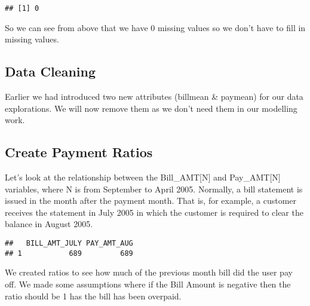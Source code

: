 \documentclass[]{article}
\newenvironment{Shaded}{\begin{snugshade}}{\end{snugshade}}
\newcommand{\KeywordTok}[1]{\textcolor[rgb]{0.13,0.29,0.53}{\textbf{#1}}}
\newcommand{\DecValTok}[1]{\textcolor[rgb]{0.00,0.00,0.81}{#1}}
\newcommand{\StringTok}[1]{\textcolor[rgb]{0.31,0.60,0.02}{#1}}
\newcommand{\OtherTok}[1]{\textcolor[rgb]{0.56,0.35,0.01}{#1}}
\newcommand{\OperatorTok}[1]{\textcolor[rgb]{0.81,0.36,0.00}{\textbf{#1}}}
\newcommand{\NormalTok}[1]{#1}
\begin{document}
\begin{verbatim}
## [1] 0
\end{verbatim}

So we can see from above that we have 0 missing values so we don't have
to fill in missing values.

\subsection{Data Cleaning}\label{data-cleaning}

Earlier we had introduced two new attributes (billmean \& paymean) for
our data explorations. We will now remove them as we don't need them in
our modelling work.

\begin{Shaded}
\end{Shaded}

\subsection{Create Payment Ratios}\label{create-payment-ratios}

Let's look at the relationship between the Bill\_AMT{[}N{]} and
Pay\_AMT{[}N{]} variables, where N is from September to April 2005.
Normally, a bill statement is issued in the month after the payment
month. That is, for example, a customer receives the statement in July
2005 in which the customer is required to clear the balance in August
2005.

\begin{Shaded}
\end{Shaded}

\begin{verbatim}
##   BILL_AMT_JULY PAY_AMT_AUG
## 1           689         689
\end{verbatim}

We created ratios to see how much of the previous month bill did the
user pay off. We made some assumptions where if the Bill Amount is
negative then the ratio should be 1 has the bill has been overpaid.
\end{document}
